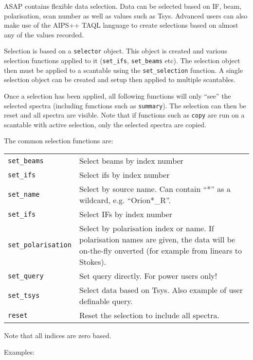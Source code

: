 \documentclass[11pt]{article}
\newcommand{\cmd}[1]{{\tt #1}}
\begin{document}
ASAP contains flexible data selection. Data can be selected based on
IF, beam, polarisation, scan number as well as values such as
Tsys. Advanced users can also make use of the AIPS++ TAQL language to
create selections based on almost any of the values recorded.

Selection is based on a \cmd{selector} object. This object is created
and various selection functions applied to it (\cmd{set\_ifs},
\cmd{set\_beams} etc). The selection object then must be applied to a
scantable using the \cmd{set\_selection} function. A single selection
object can be created and setup then applied to multiple scantables.

Once a selection has been applied, all following functions will only
``see'' the selected spectra (including functions such as
\cmd{summary}). The selection can then be reset and all spectra are
visible. Note that if functions such as \cmd{copy} are run on a
scantable with active selection, only the selected spectra are copied.

The common selection functions are:

\begin{tabular}{ll}

\cmd{set\_beams} & Select beams by index number \\
\cmd{set\_ifs} & Select ifs by index number \\
\cmd{set\_name} & Select by source name. Can contain ``*'' as a
wildcard, e.g. ``Orion*\_R''. \\
\cmd{set\_ifs} & Select IFs by index number \\

\cmd{set\_polarisation} & \parbox[t]{0.73\textwidth}{Select by
polarisation index or name. If polarisation names are given, the data
will be on-the-fly onverted (for example from linears to Stokes). }\\

\cmd{set\_query} & Set query directly. For power users only! \\
\cmd{set\_tsys} & Select data based on Tsys. Also example of user
definable query. \\
\cmd{reset} & Reset the selection to include all spectra. \\

\end{tabular}

Note that all indices are zero based.

Examples:
\end{document}
